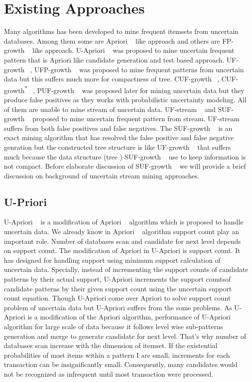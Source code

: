 \section{Existing Approaches}
Many algorithms has been developed to mine frequent itemsets from uncertain databases. Among them some are Apriori ~\cite{apriori} like approach and others are FP-growth ~\cite{fp_growth} like approach. U-Apriori ~\cite{u_priori} was proposed to mine uncertain frequent pattern that is Apriori like candidate generation and test based approach. UF-growth ~\cite{uf_growth}, UFP-growth ~\cite{ufp_growth} was proposed to mine frequent patterns from uncertain data but this suffers much more for compactness of tree. CUF-growth ~\cite{cuf_growth}, CUF-growth\textsuperscript{*} ~\cite{cuf_growth}, PUF-growth ~\cite{cuf_growth} was proposed later for mining uncertain data but they produce false positives as they works with probabilistic uncertainty modeling. All of them are unable to mine stream of uncertain data. UF-stream ~\cite{suf_growth} and SUF-growth ~\cite{suf_growth} proposed to mine uncertain frequent pattern from stream. UF-stream ~\cite{suf_growth} suffers from both false positives and false negatives. The SUF-growth ~\cite{suf_growth} is an exact mining algorithm that has resolved the false positive and false negative genration but the constructed tree structure is like UF-growth ~\cite{uf_growth} that suffers much because the data structure (tree ) SUF-growth ~\cite{suf_growth} use to keep information is not compact. Before elaborate discussion of SUF-growth ~\cite{suf_growth} we will provide a brief discussion on background of uncertain stream mining approaches.
	
	
	\subsection{U-Priori}
	U-Apriori ~\cite{u_priori} is a  modification of Apriori ~\cite{apriori} algorithm which is proposed to handle uncertain data. We already know in Apriori ~\cite{apriori} algorithm support count play an important role. Number of databases scan and candidate for next level depends on support count. The modification of Apriori in U-Apriori is support count. It has designed for handling support using minimum support calculation of uncertain data. Specially, instead of incrementing the support counts of candidate patterns by their actual support, U-Apriori increments the support countsof candidate patterns by their given support count using the uncertain support count equation. Though U-Apriori come over Apriori to solve support count problem of uncertain data but U-Apriori suffers from the some problems. As U-Apriori is a modification of the Apriori algorithm, performance of U-Apriori algorithm for large scale of data because it follows level wise sub-patterns generation and merge to generate candidate for next level. That's why number of databases scan increase with the dimension of itemset. If the existential probabilities of most items within a pattern I are small, increments for each transaction can be insignificantly small. Consequently, many candidates would not be recognized as infrequent until most transaction were processed.  
	
